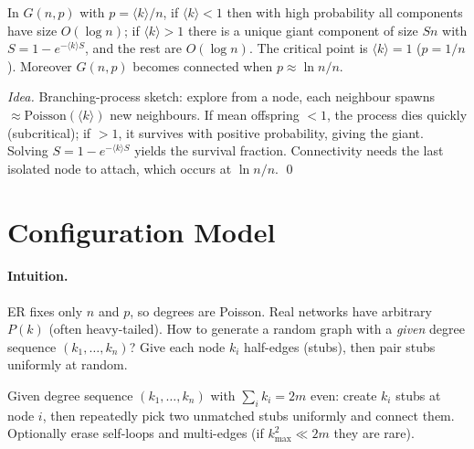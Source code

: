 \begin{theorem}\label{thm:giant}
In $G(n,p)$ with $p=\langle k\rangle/n$, if $\langle k\rangle<1$ then with high probability all components have size $O(\log n)$; if $\langle k\rangle>1$ there is a unique giant component of size $Sn$ with $S=1-e^{-\langle k\rangle S}$, and the rest are $O(\log n)$. The critical point is $\langle k\rangle=1$ ($p=1/n$). Moreover $G(n,p)$ becomes connected when $p\approx\ln n/n$.
\end{theorem}
\begin{proof}[Idea]
Branching-process sketch: explore from a node, each neighbour spawns $\approx\text{Poisson}(\langle k\rangle)$ new neighbours. If mean offspring $<1$, the process dies quickly (subcritical); if $>1$, it survives with positive probability, giving the giant. Solving $S=1-e^{-\langle k\rangle S}$ yields the survival fraction. Connectivity needs the last isolated node to attach, which occurs at $\ln n/n$. \qed
\end{proof}

\section{Configuration Model}
\label{sec:config}
\paragraph{Intuition.} ER fixes only $n$ and $p$, so degrees are Poisson. Real networks have arbitrary $P(k)$ (often heavy-tailed). How to generate a random graph with a \emph{given} degree sequence $(k_1,\dots,k_n)$? Give each node $k_i$ half-edges (stubs), then pair stubs uniformly at random.

\begin{definition}\label{def:config}
Given degree sequence $(k_1,\dots,k_n)$ with $\sum_i k_i=2m$ even: create $k_i$ stubs at node $i$, then repeatedly pick two unmatched stubs uniformly and connect them. Optionally erase self-loops and multi-edges (if $k_{\max}^2\ll2m$ they are rare).
\end{definition}


